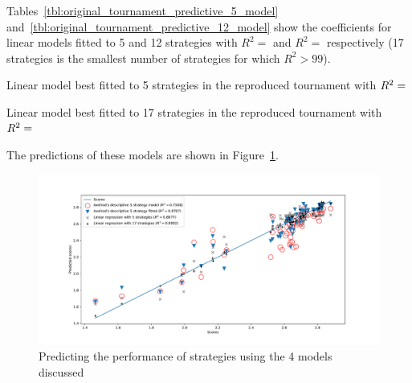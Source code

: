 \documentclass{article}
\begin{document}
Tables~\ref{tbl:original_tournament_predictive_5_model}
and~\ref{tbl:original_tournament_predictive_12_model} show the coefficients for
linear models fitted to 5 and 12 strategies with
\(R^2=\) and
\(R^2=\)
respectively (17 strategies is the smallest number of strategies for which
\(R^2>99\)).


\begin{table}[!hbtp]
        \centering
        
        \caption{Linear model best fitted to 5 strategies in the reproduced tournament
                 with
             \(R^2=\protect\)}
        \label{tbl:original_tournament_predictive_5_model}
\end{table}

\begin{table}[!hbtp]
        \centering
        
        \caption{Linear model best fitted to 17 strategies in the reproduced tournament
                 with
             \(R^2=\protect\)}
        \label{tbl:original_tournament_predictive_17_model}
\end{table}

The predictions of these models are shown in
Figure~\ref{fig:original_tournament_predictive_score_models}.

\begin{figure}[!hbtp]
    \centering
    \includegraphics[width=.9\textwidth]{assets/original_tournament_predictive_score_models.pdf}
    \caption{Predicting the performance of strategies using the 4 models
             discussed}
    \label{fig:original_tournament_predictive_score_models}
\end{figure}
\end{document}
